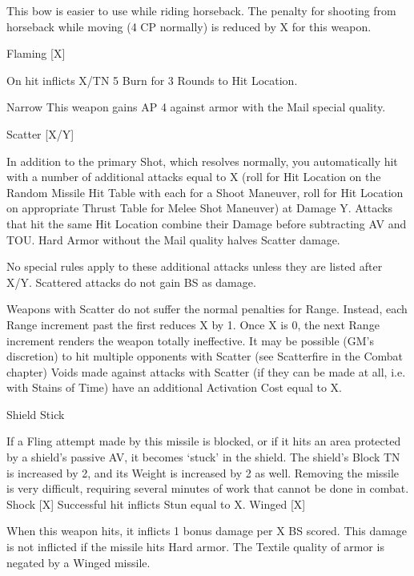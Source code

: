\documentclass[oneside,11pt,english]{book}
\begin{document}
This bow is easier to use while riding horseback. The penalty for shooting from horseback while 
moving (4 CP normally) is reduced by X for this weapon. 

Flaming 
[X] 

On hit inflicts X/TN 5 Burn for 3 Rounds to Hit Location. 

Narrow This weapon gains AP 4 against armor with the Mail special quality. 


Scatter 
[X/Y] 

In addition to the primary Shot, which resolves normally, you automatically hit with a number of 
additional attacks equal to X (roll for Hit Location on the Random Missile Hit Table with each for a 
Shoot Maneuver, roll for Hit Location on appropriate Thrust Table for Melee Shot Maneuver) at 
Damage Y. Attacks that hit the same Hit Location combine their Damage before subtracting AV and 
TOU. 
Hard Armor without the Mail quality halves Scatter damage. 

 

 No special rules apply to these additional attacks unless they are listed after X/Y. Scattered attacks do 
not gain BS as damage. 

 

Weapons with Scatter do not suffer the normal penalties for Range. Instead, each Range increment 
past the first reduces X by 1. Once X is 0, the next Range increment renders the weapon totally 
ineffective. It may be possible (GM’s discretion) to hit multiple opponents with Scatter (see 
Scatterfire in the Combat chapter) 
Voids made against attacks with Scatter (if they can be made at all, i.e. with Stains of Time) have an 
additional Activation Cost equal to X. 

Shield 
Stick 

If a Fling attempt made by this missile is blocked, or if it hits an area protected by a shield’s passive 
AV, it becomes ‘stuck’ in the shield. The shield’s Block TN is increased by 2, and its Weight is 
increased by 2 as well. Removing the missile is very difficult, requiring several minutes of work that 
cannot be done in combat. 
Shock [X] Successful hit inflicts Stun equal to X. 
Winged 
[X] 

When this weapon hits, it inflicts 1 bonus damage per X BS scored. This damage is not inflicted if the 
missile hits Hard armor. The Textile quality of armor is negated by a Winged missile. 

 
\end{document}
